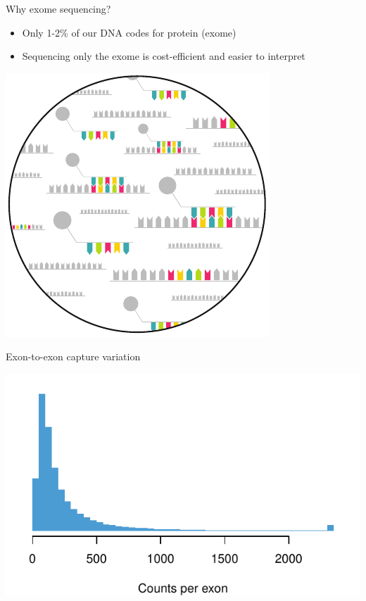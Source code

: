 \documentclass[
  10pt,
  ignorenonframetext,
  m]{beamer}
\begin{document}
\begin{frame}{Why exome sequencing?}
\protect\hypertarget{why-exome-sequencing}{}

\begin{itemize}
\item
  Only 1-2\% of our DNA codes for protein (exome)
\item
  Sequencing only the exome is cost-efficient and easier to interpret
\end{itemize}

\bigskip

\centering

\includegraphics[width=\textwidth,height=0.5\textheight]{images/captureBubble.pdf}

\end{frame}

\begin{frame}{Exon-to-exon capture variation}
\protect\hypertarget{exon-to-exon-capture-variation}{}

\begin{center}\includegraphics{defense_files/figure-beamer/exonCapVar-1} \end{center}

\end{frame}
\end{document}
